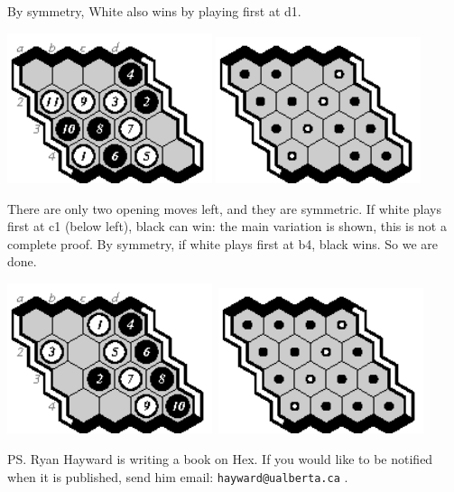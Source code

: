\documentclass[12pt]{article}
\begin{document}
By symmetry, White also wins by playing first at d1.
\vfill

\includegraphics[width=60mm]{fz/pix/4z.eps}
\includegraphics[width=60mm]{fz/pix/4x4.winners2.eps}
\vfill

There are only two opening moves left, and they are symmetric.
If white plays first at c1 (below left), black can win:
the main variation is shown, this is not a complete proof.
By symmetry, if white plays first at b4, black wins.
So we are done.
\vfill

\includegraphics[width=60mm]{fz/pix/4last.eps}\
\includegraphics[width=60mm]{fz/pix/4x4.winners.eps}
\vfill

PS. Ryan Hayward is writing a book on Hex. If you would like
to be notified when it is published, send him email:
\verb+hayward@ualberta.ca+ .

\end{document}
